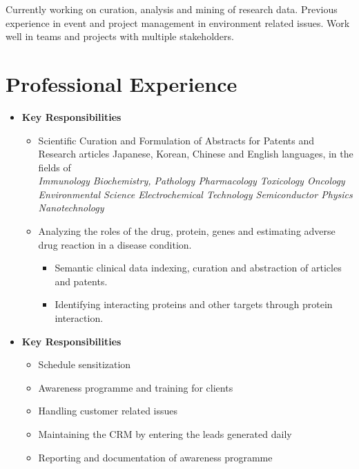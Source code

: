 \documentclass[11pt,a4paper,sans]{moderncv}        %
\begin{document}
\makecvtitle

\small{Currently working on curation, analysis and mining of research data. Previous experience in event and project management in environment related issues. Work well in teams and projects with multiple stakeholders.}

\section{Professional Experience}
    \vspace{5pt}

\begin{itemize}


    \item{}
    \vspace{2mm}
    \textbf{Key Responsibilities}
    \begin{itemize}
        \item Scientific Curation and Formulation of Abstracts for Patents and Research articles   Japanese, Korean, Chinese and English languages, in the fields of \\
            \textit{ \textbullet{} Immunology \textbullet{}  Biochemistry,\textbullet{}  Pathology \textbullet{}  Pharmacology\textbullet{}  Toxicology\textbullet{}  Oncology\textbullet{}   Environmental Science\textbullet{} Electrochemical Technology\textbullet{}  Semiconductor Physics \textbullet{} Nanotechnology}
    \item Analyzing the roles of the drug, protein, genes and estimating adverse drug reaction in a disease condition.
        \begin{itemize}
            \item Semantic clinical data indexing, curation and abstraction of  articles and patents.
            \item Identifying interacting proteins and other targets through protein interaction.
        \end{itemize}
    \end{itemize}

        
    \vspace{4mm}


    \item{}
    \vspace{2mm}

    \textbf{Key Responsibilities}
    \begin{itemize}
        \item Schedule sensitization
        \item Awareness programme and training for clients
        \item Handling customer related issues
        \item Maintaining the CRM by entering the leads generated daily
        \item Reporting and documentation of awareness programme
    \end{itemize}


\end{itemize}
\end{document}
